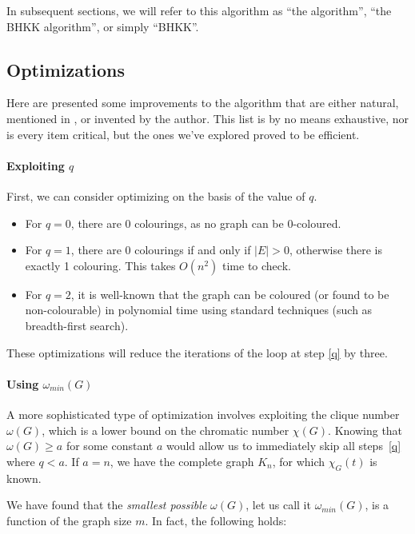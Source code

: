 \documentclass{cslthse-msc}
\begin{document}
In subsequent sections, we will refer to this algorithm as ``the algorithm'', ``the BHKK algorithm'', or simply ``BHKK''.

\subsection{Optimizations}\label{optimizations}
Here are presented some improvements to the algorithm that are either natural, mentioned in \cite{cov_pack}, or invented by the author. This list is by no means exhaustive, nor is every item critical, but the ones we've explored proved to be efficient. 

\paragraph{Exploiting $q$}
First, we can consider optimizing on the basis of the value of $q$.
\begin{itemize}
\item For $q = 0$, there are 0 colourings, as no graph can be 0-coloured.
\item For $q = 1$, there are 0 colourings if and only if $|E| > 0$, otherwise there is exactly 1 colouring. This takes $O(n^2)$ time to check.
\item For $q = 2$, it is well-known that the graph can be coloured (or found to be non-colourable) in polynomial time using standard techniques (such as breadth-first search).
\end{itemize}

These optimizations will reduce the iterations of the loop at step \ref{q} by three.

\paragraph{Using $\omega_{min}(G)$}\label{omega}
A more sophisticated type of optimization involves exploiting the clique number $\omega(G)$, which is a lower bound on the chromatic number $\chi(G)$. Knowing that $\omega(G) \geq a$ for some constant $a$ would allow us to immediately skip all steps~\ref{q} where $q < a$. If $a = n$, we have the complete graph $K_n$, for which $\chi_G(t)$ is known.

We have found that the \emph{smallest possible} $\omega(G)$, let us call it $\omega_{min}(G)$, is a function of the graph size $m$. In fact, the following holds:
\end{document}

